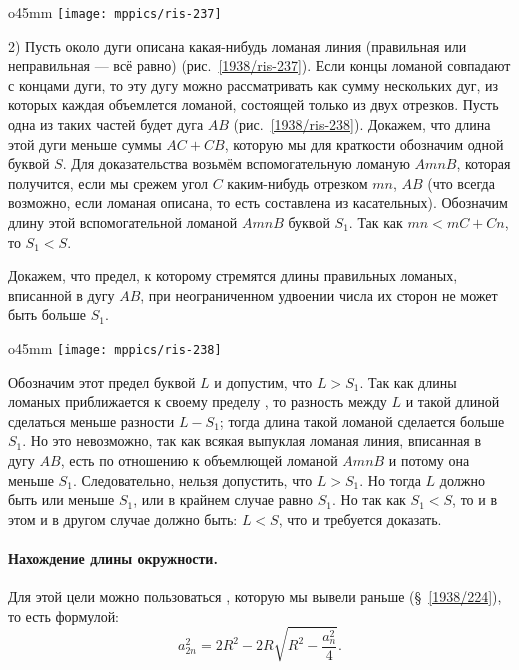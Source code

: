 \begin{wrapfigure}[6]{o}{45mm}
\vskip-3mm
\centering
\texttt{[image: mppics/ris-237]}
\caption{}\label{1938/ris-237}
\end{wrapfigure}

2) Пусть около дуги описана какая-нибудь ломаная линия (правильная или неправильная — всё равно) (рис.~\ref{1938/ris-237}).
Если концы ломаной совпадают с концами дуги, то эту дугу можно рассматривать как сумму нескольких дуг, из которых каждая объемлется ломаной, состоящей только из двух отрезков.
Пусть одна из таких частей будет дуга $AB$ (рис.~\ref{1938/ris-238}).
Докажем, что длина этой дуги меньше суммы $AC+CB$, которую мы для краткости обозначим одной буквой $S$.
Для доказательства возьмём вспомогательную ломаную $AmnB$, которая получится, если мы срежем угол $C$ каким-нибудь отрезком $mn$,  $AB$ (что всегда возможно, если ломаная описана, то есть составлена из касательных).
Обозначим длину этой вспомогательной ломаной $AmnB$ буквой $S_1$.
Так как $mn<mC+Cn$, то $S_1<S$.

Докажем, что предел, к которому стремятся длины правильных ломаных, вписанной в дугу $AB$, при неограниченном удвоении числа их сторон не может быть больше $S_1$.

\begin{wrapfigure}{o}{45mm}
\centering
\texttt{[image: mppics/ris-238]}
\caption{}\label{1938/ris-238}
\end{wrapfigure}

Обозначим этот предел буквой $L$ и допустим, что $L>S_1$.
Так как длины ломаных приближается к своему пределу , то разность между $L$ и такой длиной сделаться меньше разности $L-S_1$; тогда длина такой ломаной сделается больше $S_1$.
Но это невозможно, так как всякая выпуклая ломаная линия, вписанная в дугу $AB$, есть  по отношению к объемлющей ломаной $AmnB$ и потому она меньше $S_1$.
Следовательно, нельзя допустить, что $L>S_1$.
Но тогда $L$ должно быть или меньше $S_1$, или в крайнем случае равно $S_1$.
Но так как $S_1<S$, то и в этом и в другом случае должно быть:
$L<S$, что и требуется доказать.

\paragraph{Нахождение длины окружности.}\label{1938/237}
Для этой цели можно пользоваться , которую мы вывели раньше (§~\ref{1938/224}), то есть формулой:
\[a_{2n}^2=2R^2-2R\sqrt{R^2-\frac{a_n^2}4}.\]

